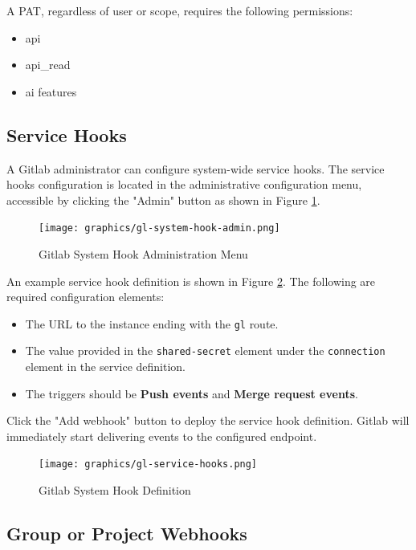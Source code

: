 A PAT, regardless of user or scope, requires the following permissions:

\begin{itemize}
  \item api
  \item api\_read
  \item ai features
\end{itemize}

\subsection{Service Hooks}

A Gitlab administrator can configure system-wide service hooks.  The service hooks configuration is located in the
administrative configuration menu, accessible by clicking the "Admin" button as shown in Figure \ref{fig:gl-admin-menu}.

\begin{figure}[ht]
  \centering
  \texttt{[image: graphics/gl-system-hook-admin.png]}
  \caption{Gitlab System Hook Administration Menu}
  \label{fig:gl-admin-menu}
\end{figure}


An example service hook definition is shown in Figure \ref{fig:gl-service-hook-def}.  The following are
required configuration elements:

\begin{itemize}
  \item The URL to the \cxoneflow instance ending with the \texttt{gl} route.
  \item The value provided in the \texttt{shared-secret} element under the \texttt{connection} element in the service definition.
  \item The triggers should be \textbf{Push events} and \textbf{Merge request events}.
\end{itemize}

Click the "Add webhook" button to deploy the service hook definition.  Gitlab will immediately start delivering
events to the configured \cxoneflow endpoint.

\begin{figure}[ht]
  \centering
  \texttt{[image: graphics/gl-service-hooks.png]}
  \caption{Gitlab System Hook Definition}
  \label{fig:gl-service-hook-def}
\end{figure}

\subsection{Group or Project Webhooks}

